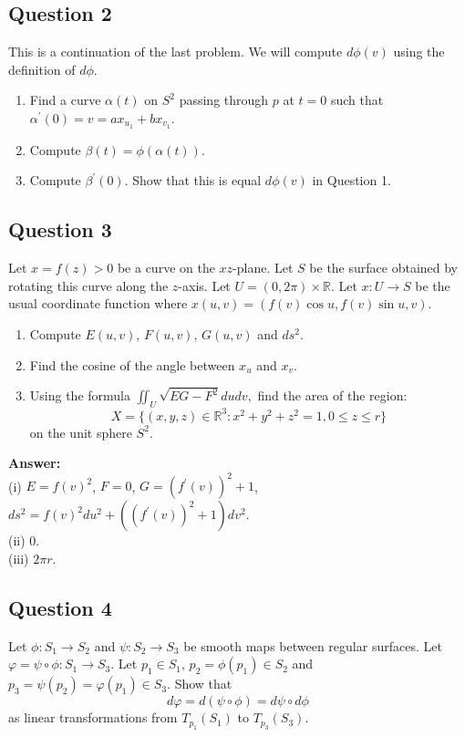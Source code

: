 \documentclass[12pt, a4paper]{article}
\newcommand{\R}{\mathbb{R}}
\begin{document}
\subsection*{Question 2}
This is a continuation of the last problem. We will compute $d\phi(v)$ using the definition of $d\phi$.
\begin{enumerate}[label=(\roman*)]
    \item Find a curve $\alpha(t)$ on $S^{2}$ passing through $p$ at $t=0$ such that $\alpha^{\prime}(0)=v=ax_{u_{1}}+bx_{v_{1}}$.
    \item Compute $\beta(t)=\phi(\alpha(t))$.
    \item Compute $\beta^{\prime}(0)$. Show that this is equal $d\phi(v)$ in Question 1.
\end{enumerate}
\newpage

\subsection*{Question 3}
Let $x=f(z)>0$ be a curve on the $xz$-plane. Let $S$ be the surface obtained by rotating this curve along the $z$-axis. Let $U=(0,2\pi)\times\R$. Let $x:U\rightarrow S$ be the usual coordinate function where $x(u,v)=(f(v)\cos u,f(v)\sin u,v)$.
\begin{enumerate}[label=(\roman*)]
    \item Compute $E(u,v)$, $F(u,v)$, $G(u,v)$ and $ds^{2}$.
    \item Find the cosine of the angle between $x_{u}$ and $x_{v}$.
    \item Using the formula $\iint_{U}\sqrt{EG-F^{2}}dudv,$ find the area of the region:
    \[ X=\{(x,y,z)\in\R^{3}:x^{2}+y^{2}+z^{2}=1,0\le z\le r\} \]
    on the unit sphere $S^{2}$.
\end{enumerate}
\vspace{1em}
\noindent\textbf{Answer:}\\
(i) $E=f(v)^{2}$, $F=0$, $G=(f^{\prime}(v))^{2}+1$, $ds^{2}=f(v)^{2}du^{2}+((f^{\prime}(v))^{2}+1)dv^{2}$.\\
(ii) 0.\\
(iii) $2\pi r$.
\newpage

\subsection*{Question 4}
Let $\phi:S_{1}\rightarrow S_{2}$ and $\psi: S_{2}\rightarrow S_{3}$ be smooth maps between regular surfaces. Let $\varphi=\psi\circ\phi:S_{1}\rightarrow S_{3}$. Let $p_{1}\in S_{1}$, $p_{2}=\phi(p_{1})\in S_{2}$ and $p_{3}=\psi(p_{2})=\varphi(p_{1})\in S_{3}.$ Show that
\[ d\varphi=d(\psi\circ\phi)=d\psi\circ d\phi \]
as linear transformations from $T_{p_{1}}(S_{1})$ to $T_{p_{3}}(S_{3})$.
\newpage
\end{document}
